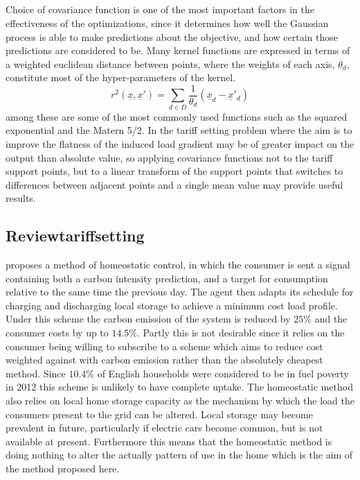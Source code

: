 \documentclass[a4paper, 10 pt, conference]{ieeeconf}  %
\begin{document}
\subsection{}
Choice of covariance function is one of the most important factors in the effectiveness of the optimizations, since it determines how well the Gaussian process is able to make predictions about the objective, and how certain those predictions are considered to be. Many kernel functions are expressed in terms of a weighted euclidean distance between points, where the weights of each axis, $\theta_{d}$, constitute most of the hyper-parameters of the kernel.
\begin{equation}
r^{2}(\underline{x},\underline{x}') = \sum_{d \in D}\frac{1}{\theta_{d}}(\underline{x}_{d}-\underline{x}'_{d}) 
\end{equation}
among these are some of the most commonly used functions such as the squared exponential and the Matern 5/2. In the tariff setting problem where the aim is to improve the flatness of the induced load gradient may be of greater impact on the output than absolute value, so applying covariance functions not to the tariff support points, but to a linear transform of the support points that switches to differences between adjacent points and a single mean value may provide useful results.
\subsection{Reviewtariffsetting}

\cite{ramchurn2011agenthomeo} proposes a method of homeostatic control, in which the consumer is sent a signal containing both a carbon intensity prediction, and a target for consumption relative to the same time the previous day. The agent then adapts its schedule for charging and discharging local storage to achieve a minimum cost load profile. Under this scheme the carbon emission of the system is reduced by $25\%$ and the consumer costs by up to $14.5\%$. Partly this is not desirable since it relies on the consumer being willing to subscribe to a scheme which aims to reduce cost weighted against with carbon emission rather than the absolutely cheapest method. Since $10.4\%$ of English households were considered to be in fuel poverty in 2012 \cite{govfuelpov} this scheme is unlikely to have complete uptake. The homeostatic method also relies on local home storage capacity as the mechanism by which the load the consumers present to the grid can be altered. Local storage may become prevalent in future, particularly if electric cars become common, but is not available at present. Furthermore this means that the homeostatic method is doing nothing to alter the actually pattern of use in the home which is the aim of the method proposed here.
\end{document}
